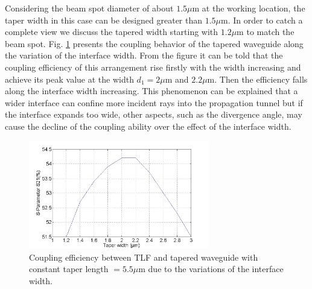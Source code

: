 Considering the beam spot diameter of about $1.5\mu$m at the working location, the taper width in this case can be designed greater than $1.5\mu$m. In order to catch a complete view we discuss the tapered width starting with $1.2\mu$m to match the beam spot. Fig. \ref{fig:tapered_waveguide_wxx} presents the coupling behavior of the tapered waveguide along the variation of the interface width. From the figure it can be told that the coupling efficiency of this arrangement rise firstly with the width increasing and achieve its peak value at the width $d_{1}=2\mu$m and $2.2\mu$m. Then the efficiency falls along the interface width increasing. This phenomenon can be explained that a wider interface can confine more incident rays into the propagation tunnel but if the interface expands too wide, other aspects, such as the divergence angle,  may cause the decline of the coupling ability over the effect of the interface width. 


\begin{figure}[!ht]
\centering
\includegraphics[width=0.7\textwidth]{bilder/tapered_waveguide_wxx}
\caption{Coupling efficiency between TLF and tapered waveguide with constant taper length $= 5.5\mu$m due to the variations of the interface width.}
\label{fig:tapered_waveguide_wxx}
\end{figure}
